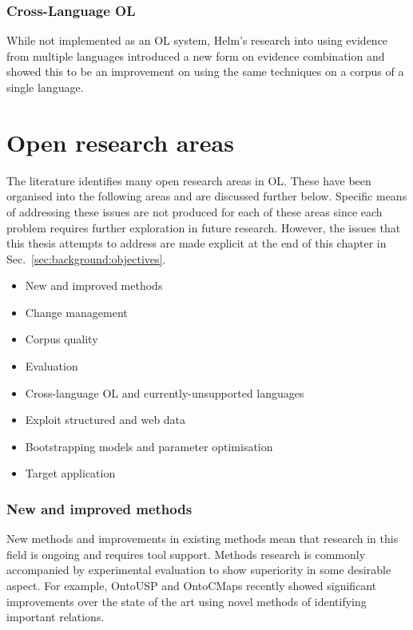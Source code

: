 \documentclass[a4paper]{report}
\begin{document}
\subsubsection{Cross-Language OL}

While not implemented as an OL system, Helm's research into using evidence from multiple languages introduced a new form on evidence combination and showed this to be an improvement on using the same techniques on a corpus of a single language.

\section{Open research areas}
\label{sec:background:open-areas}

The literature identifies many open research areas in OL.
These have been organised into the following areas and are discussed further below. Specific means of addressing these issues are not produced for each of these areas since each problem requires further exploration in future research.
However, the issues that this thesis attempts to address are made explicit at the end of this chapter in Sec.~\ref{sec:background:objectives}.

\begin{itemize}
\item New and improved methods
\item Change management
\item Corpus quality
\item Evaluation
\item Cross-language OL and currently-unsupported languages
\item Exploit structured and web data
\item Bootstrapping models and parameter optimisation
\item Target application
\end{itemize}

\subsubsection{New and improved methods}

New methods and improvements in existing methods mean that research in this field is ongoing and requires tool support.
Methods research is commonly accompanied by experimental evaluation to show superiority in some desirable aspect\cite{Basili96Experi}.
For example, OntoUSP and OntoCMaps recently showed significant improvements over the state of the art using novel methods of identifying important relations.
\end{document}
